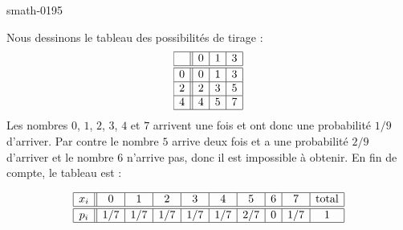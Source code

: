 
\begin{corrige}{smath-0195}

Nous dessinons le tableau des possibilités de tirage :
\begin{equation*}
    \begin{array}[]{|c||c|c|c|}
        \hline
        &0&1&3\\
        \hline\hline
        0&0&1&3\\
        \hline
        2&2&3&5\\
        \hline
        4&4&5&7\\
        \hline
    \end{array}
\end{equation*}
Les nombres \( 0\), \( 1\), \( 2\), \( 3\), \( 4\) et \( 7\) arrivent une fois et ont donc une probabilité \( 1/9\) d'arriver. Par contre le nombre \( 5\) arrive deux fois et a une probabilité \( 2/9\) d'arriver et le nombre \( 6\) n'arrive pas, donc il est impossible à obtenir. En fin de compte, le tableau est :

\begin{center}
    \begin{equation*}
        \begin{array}[]{|c||c|c|c|c|c|c|c|c|c|}
            \hline
            x_i&0&1&2&3&4&5&6&7&\text{total}\\
              \hline\hline
              p_i&1/7&1/7&1/7&1/7&1/7&2/7&0&1/7&1\\
              \hline 
               \end{array}
           \end{equation*}
\end{center}


\end{corrige}
